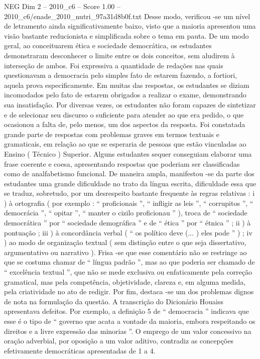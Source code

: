 \begin{textsample}{NEG Dim 2 – 2010\_c6 – Score 1.00 – 2010\_c6/enade\_2010\_nutri\_97a31d8b0f.txt}
Desse modo, verificou -se um nível de letramento ainda significativamente baixo, visto que a maioria apresentou uma visão bastante reducionista e simplificada sobre o tema em pauta.
De um modo geral, ao conceituarem ética e sociedade democrática, os estudantes demonstraram desconhecer o limite entre os dois conceitos, sem aludirem à interseção de ambos.
Foi expressiva a quantidade de redações nas quais questionavam a democracia pelo simples fato de estarem fazendo, a fortiori, aquela prova especificamente.
Em muitas das respostas, os estudantes se diziam incomodados pelo fato de estarem obrigados a realizar o exame, demonstrando sua insatisfação.
Por diversas vezes, os estudantes não foram capazes de sintetizar e de selecionar seu discurso o suficiente para atender ao que era pedido, o que ocasionou a falta de, pelo menos, um dos aspectos da resposta.
Foi constatada grande parte de respostas com problemas graves em termos textuais e gramaticais, em relação ao que se esperaria de pessoas que estão vinculadas ao Ensino ( Técnico ) Superior.
Alguns estudantes sequer conseguiam elaborar uma frase coerente e coesa, apresentando respostas que poderiam ser classificadas como de analfabetismo funcional.
De maneira ampla, manifestou -se da parte dos estudantes uma grande dificuldade no trato da língua escrita, dificuldade essa que se traduz, sobretudo, por um desrespeito bastante frequente às regras relativas : i ) à ortografia ( por exemplo : “ proficionais ”, “ infligir as leis ”, “ corrupitos ”, “ democrácia ”, “ opitar ”, “ manter o cizilo proficionau ” ), troca de “ sociedade democrática ” por “ sociedade demográfica ” e de “ ética ” por “ étnica ” ; ii ) à pontuação ; iii ) à concordância verbal ( “ os político deve (... ) eles pode ” ) ; iv ) ao modo de organização textual ( sem distinção entre o que seja dissertativo, argumentativo ou narrativo ).
Frisa -se que esse comentário não se restringe ao que se costuma chamar de “ língua padrão ”, mas ao que poderia ser chamado de “ excelência textual ”, que não se mede exclusiva ou enfaticamente pela correção gramatical, mas pela competência, objetividade, clareza e, em alguma medida, pela criatividade no ato de redigir.
Por fim, destaca -se um dos problemas dignos de nota na formulação da questão.
A transcrição do Dicionário Houaiss apresentava defeitos.
Por exemplo, a definição 5 de “ democracia ” indicava que esse é o tipo de “ governo que acata a vontade da maioria, embora respeitando os direitos e a livre expressão das minorias ”.
O emprego de um valor concessivo na oração adverbial, por oposição a um valor aditivo, contradiz as concepções efetivamente democráticas apresentadas de 1 a 4.

\end{textsample}
